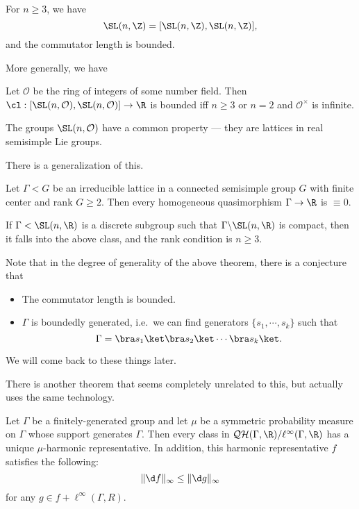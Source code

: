 \documentclass[a4paper]{article}
\newcommand\QH{\mathcal{QH}}
\begin{document}
\begin{thm}
  For $n \geq 3$, we have
  \[
    \SL(n, \Z) = [\SL(n, \Z), \SL(n, \Z)],
  \]
  and the commutator length is bounded.
\end{thm}

More generally, we have
\begin{thm}
  Let $\mathcal{O}$ be the ring of integers of some number field. Then $\cl: [\SL(n, \mathcal{O}), \SL(n, \mathcal{O})] \to \R$ is bounded iff $n \geq 3$ or $n = 2$ and $\mathcal{O}^\times$ is infinite.
\end{thm}
The groups $\SL(n, \mathcal{O})$ have a common property --- they are lattices in real semisimple Lie groups.

There is a generalization of this.
\begin{thm} %
  Let $\Gamma < G$ be an irreducible lattice in a connected semisimple group $G$ with finite center and rank $G \geq 2$. Then every homogeneous quasimorphism $\Gamma \to \R$ is $\equiv 0$.
\end{thm}

\begin{eg}
  If $\Gamma < \SL(n, \R)$ is a discrete subgroup such that $\Gamma \backslash \SL(n, \R)$ is compact, then it falls into the above class, and the rank condition is $n \geq 3$.
\end{eg}
Note that in the degree of generality of the above theorem, there is a conjecture that
\begin{itemize}
  \item The commutator length is bounded.
  \item $\Gamma$ is boundedly generated, i.e.\ we can find generators $\{s_1, \cdots, s_k\}$ such that
    \[
      \Gamma = \bra s_1 \ket \bra s_2\ket \cdots \bra s_k\ket.
    \]
\end{itemize}

We will come back to these things later.

There is another theorem that seems completely unrelated to this, but actually uses the same technology.
\begin{thm}
  Let $\Gamma$ be a finitely-generated group and let $\mu$ be a symmetric probability measure on $\Gamma$ whose support generates $\Gamma$. Then every class in $\QH(\Gamma, \R)/\ell^\infty(\Gamma, \R)$ has a unique $\mu$-harmonic representative. In addition, this harmonic representative $f$ satisfies the following:
  \[
    \|\d f\|_\infty \leq \|\d g\|_\infty
  \]
  for any $g \in f+ \ell^\infty(\Gamma, R)$.
\end{thm}
\end{document}
